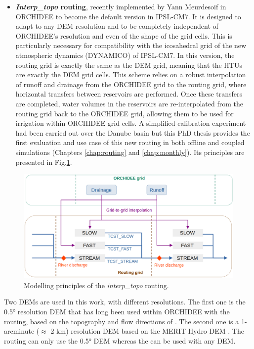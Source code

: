 \begin{itemize}
\item \textbf{\textit{Interp\_topo} routing}, recently implemented by Yann Meurdesoif in ORCHIDEE to become the default version in IPSL-CM7. 
It is designed to adapt to any DEM resolution and to be completely independent of ORCHIDEE’s resolution and even of the shape of the grid cells. This is particularly necessary for compatibility with the icosahedral grid of the new atmospheric dynamics (DYNAMICO) of IPSL-CM7.
In this version, the routing grid is exactly the same as the DEM grid, meaning that the HTUs are exactly the DEM grid cells. This scheme relies on a robust interpolation \citep{kritsikis_conservative_2017} of runoff and drainage from the ORCHIDEE grid to the routing grid, where horizontal transfers between reservoirs are performed. Once these transfers are completed, water volumes in the reservoirs are re-interpolated from the routing grid back to the ORCHIDEE grid, allowing them to be used for irrigation within ORCHIDEE grid cells. 
A simplified calibration experiment had been carried out over the Danube basin \citep{kilic_evaluation_2023} but this PhD thesis provides the first evaluation and use case of this new routing in both offline and coupled simulations (Chapters \ref{chap:routing} and \ref{chap:monthly}).
Its principles are presented in Fig.\ref{fig:routing_principles}.
\end{itemize}


\begin{figure}[ht]
    \centering
    \includegraphics[width=1\textwidth]{images/methods/routing_principles.png}
    \caption{Modelling principles of the \textit{interp\_topo} routing.}
    \label{fig:routing_principles}
\end{figure}

Two DEMs are used in this work, with different resolutions. 
The first one is the 0.5° resolution DEM that has long been used within ORCHIDEE with the \std routing, based on the topography and flow directions of \citet{vorosmarty_geomorphometric_2000}.
The second one is a 1-arcminute ($\approx$ 2 km) resolution DEM based on the MERIT Hydro DEM \citep{yamazaki_merit_2019}.
The \std routing can only use the 0.5° DEM whereas the \native can be used with any DEM.

